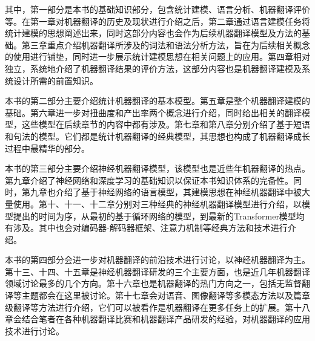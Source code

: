 \begin{spacing}{1.18}
其中，第一部分是本书的基础知识部分，包含统计建模、语言分析、机器翻译评价等。在第一章对机器翻译的历史及现状进行介绍之后，第二章通过语言建模任务将统计建模的思想阐述出来，同时这部分内容也会作为后续机器翻译模型及方法的基础。第三章重点介绍机器翻译所涉及的词法和语法分析方法，旨在为后续相关概念的使用进行铺垫，同时进一步展示统计建模思想在相关问题上的应用。第四章相对独立，系统地介绍了机器翻译结果的评价方法，这部分内容也是机器翻译建模及系统设计所需的前置知识。

本书的第二部分主要介绍统计机器翻译的基本模型。第五章是整个机器翻译建模的基础。第六章进一步对扭曲度和产出率两个概念进行介绍，同时给出相关的翻译模型，这些模型在后续章节的内容中都有涉及。第七章和第八章分别介绍了基于短语和句法的模型。它们都是统计机器翻译的经典模型，其思想也构成了机器翻译成长过程中最精华的部分。

本书的第三部分主要介绍神经机器翻译模型，该模型也是近些年机器翻译的热点。第九章介绍了神经网络和深度学习的基础知识以保证本书知识体系的完备性。同时，第九章也介绍了基于神经网络的语言模型，其建模思想在神经机器翻译中被大量使用。第十、十一、十二章分别对三种经典的神经机器翻译模型进行介绍，以模型提出的时间为序，从最初的基于循环网络的模型，到最新的Transformer模型均有涉及。其中也会对编码器-解码器框架、注意力机制等经典方法和技术进行介绍。

本书的第四部分会进一步对机器翻译的前沿技术进行讨论，以神经机器翻译为主。第十三、十四、十五章是神经机器翻译研发的三个主要方面，也是近几年机器翻译领域讨论最多的几个方向。第十六章也是机器翻译的热门方向之一，包括无监督翻译等主题都会在这里被讨论。第十七章会对语音、图像翻译等多模态方法以及篇章级翻译等方法进行介绍，它们可以被看作是机器翻译在更多任务上的扩展。第十八章会结合笔者在各种机器翻译比赛和机器翻译产品研发的经验，对机器翻译的应用技术进行讨论。

\begin{figure}[htp]
\centering
\centering

\end{figure}

\end{spacing}








